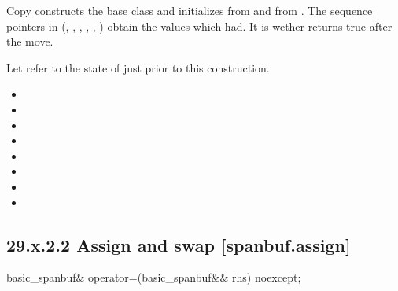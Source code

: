 \documentclass[ebook,11pt,article]{memoir}
\begin{document}
\begin{itemdescr}
\pnum
\effects 
Copy constructs the base class 
and initializes  from  and  from .
The sequence pointers in 
(, , ,
, , ) obtain
the values which  had.
It is 
wether  returns true after the move.


\pnum
\postconditions Let  refer to the state of
 just prior to this construction.

\begin{itemize}
\item {}
\item {}
\item {}
\item {}
\item {}
\item {}
\item {}
\item {}
\end{itemize}
\end{itemdescr}


\subsection{29.x.2.2 Assign and swap [spanbuf.assign]}

\begin{itemdecl}
basic_spanbuf& operator=(basic_spanbuf&& rhs) noexcept;
\end{itemdecl}
\end{document}
